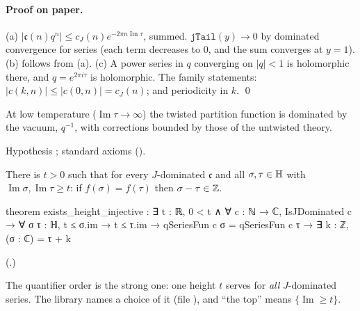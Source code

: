 \paragraph{Proof on paper.}  (a) $|\mathfrak c(n)q^n|\le c_J(n)e^{-2\pi n\operatorname{Im}\tau}$, summed.  $\mathtt{jTail}(y)\to0$ by dominated
convergence for series (each term decreases to $0$, and the sum converges at $y=1$).  (b) follows from (a).  (c) A power series
in $q$ converging on $|q|<1$ is holomorphic there, and $q=e^{2\pi i\tau}$ is holomorphic.  The family statements: $|c(k,n)|\le|c(0,n)|=
c_J(n)$; and periodicity in $k$. \qed
\begin{physics}At low temperature ($\operatorname{Im}\tau\to\infty$) the twisted partition function is dominated by the
vacuum, $q^{-1}$, with corrections bounded by those of the untwisted theory.\end{physics}
\begin{status}Hypothesis ; standard axioms ().\end{status}

\begin{theorem}\label{ch19:thm:topinj}
There is $t>0$ such that for every $J$-dominated $\mathfrak c$ and all $\sigma,\tau\in\mathbb{H}$ with $\operatorname{Im}\sigma,
\operatorname{Im}\tau\ge t$: if $f(\sigma)=f(\tau)$ then $\sigma-\tau\in{\mathbb{Z}}$.
\end{theorem}
\begin{leancode}
theorem exists_height_injective :
    ∃ t : ℝ, 0 < t ∧ ∀ c : ℕ → ℂ, IsJDominated c → ∀ σ τ : ℍ, t ≤ σ.im → t ≤ τ.im →
      qSeriesFun c σ = qSeriesFun c τ → ∃ k : ℤ, (σ : ℂ) = τ + k
\end{leancode}
(.)
\begin{dictionary}
The quantifier order is the strong one: one height $t$ serves for \emph{all} $J$-dominated series.  The library names a
choice of it  (file ), and ``the top'' means $\{\operatorname{Im}\ge t\}$.
\end{dictionary}
